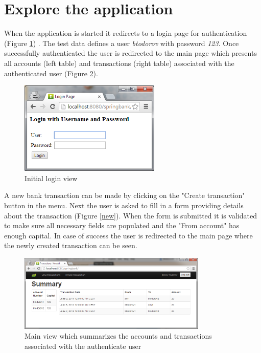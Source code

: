 \documentclass[a4paper, notitlepage]{article}
\begin{document}
\section{Explore the application}

When the application is started it redirects to a login page for authentication (Figure \ref{login}) . The test data defines a user \textit{btodorov} with password \textit{123}. Once successfully authenticated the user is redirected to the main page which presents all accounts (left table) and transactions (right table) associated with the authenticated user (Figure \ref{main}). 

\bigskip
\begin{figure}[H]
  \centering
    \includegraphics[width=0.6\textwidth]{login_Screen.png}
    \caption{Initial login view}
    \label{login}
\end{figure}
\bigskip

A new bank transaction can be made by clicking on the "Create transaction" button in the menu. Next the user is asked to fill in a form providing details about the transaction (Figure \ref{new}). When the form is submitted it is validated to make sure all necessary fields are populated and the "From account" has enough capital. In case of success the user is redirected to the main page where the newly created transaction can be seen.
 
\bigskip
\begin{figure}[H]
  \centering
    \includegraphics[width=0.8\textwidth]{main_Screen.png}
    \caption{Main view which summarizes the accounts and transactions associated with the authenticate user}
    \label{main}
\end{figure}
\bigskip
\end{document}
